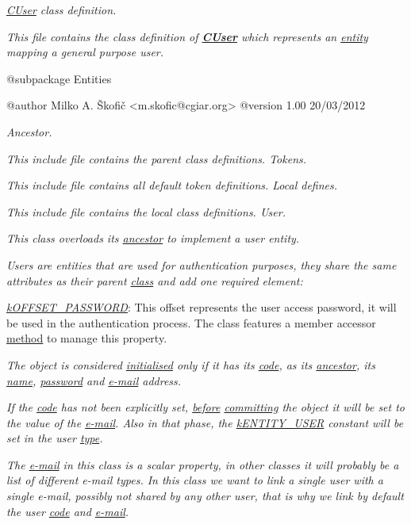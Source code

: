 {\itshape {\itshape \hyperlink{class_c_user}{C\-User}} class definition.}

{\itshape This file contains the class definition of {\bfseries \hyperlink{class_c_user}{C\-User}} which represents an \hyperlink{class_c_entity}{entity} mapping a general purpose user.}

{\itshape \begin{DoxyVerb} @subpackage        Entities

 @author            Milko A. Škofič <m.skofic@cgiar.org>
 @version   1.00 20/03/2012\end{DoxyVerb}
}

{\itshape Ancestor.}

{\itshape This include file contains the parent class definitions. Tokens.}

{\itshape This include file contains all default token definitions. Local defines.}

{\itshape This include file contains the local class definitions. User.}

{\itshape This class overloads its \hyperlink{class_c_entity}{ancestor} to implement a user entity.}

{\itshape Users are entities that are used for authentication purposes, they share the same attributes as their parent \hyperlink{class_c_entity}{class} and add one required element\-:}

{\itshape 
\begin{DoxyItemize}
\item {\itshape \hyperlink{}{k\-O\-F\-F\-S\-E\-T\-\_\-\-P\-A\-S\-S\-W\-O\-R\-D}}\-: This offset represents the user access password, it will be used in the authentication process. The class features a member accessor \hyperlink{}{method} to manage this property. 
\end{DoxyItemize}}

{\itshape The object is considered \hyperlink{}{initialised} only if it has its \hyperlink{}{code}, as its \hyperlink{class_c_entity}{ancestor}, its \hyperlink{}{name}, \hyperlink{}{password} and \hyperlink{}{e-\/mail} address.}

{\itshape If the \hyperlink{}{code} has not been explicitly set, \hyperlink{}{before} \hyperlink{}{committing} the object it will be set to the value of the \hyperlink{}{e-\/mail}. Also in that phase, the \hyperlink{}{k\-E\-N\-T\-I\-T\-Y\-\_\-\-U\-S\-E\-R} constant will be set in the user \hyperlink{}{type}.}

{\itshape The \hyperlink{}{e-\/mail} in this class is a scalar property, in other classes it will probably be a list of different e-\/mail types. In this class we want to link a single user with a single e-\/mail, possibly not shared by any other user, that is why we link by default the user \hyperlink{}{code} and \hyperlink{}{e-\/mail}.}

